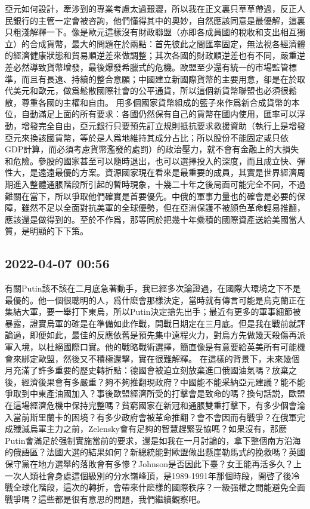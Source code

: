 \documentclass[twocolumn]{ctexart}
\begin{document}
亞元如何設計，牽涉到的專業考慮太過艱澀，所以我在正文裏只草草帶過，反正人民銀行的主管一定會被咨詢，他們懂得其中的奧妙，自然應該同意是最優解，這裏只粗淺解釋一下。像是歐元這樣沒有財政聯盟（亦即各成員國的稅收和支出相互獨立）的合成貨幣，最大的問題在於兩點：首先彼此之間匯率固定，無法視各經濟體的經濟健康狀態和貿易順逆差來做調整；其次各國的財政順逆差也有不同，嚴重逆差必然導致貨幣增發，最後爆發希臘式的危機。歐盟至少還有統一的市場監管標準，而且有長遠、持續的整合意願；中國建立新國際貨幣的主要用意，卻是在於取代美元和歐元，做爲鬆散國際社會的公平通貨，所以這個新貨幣聯盟也必須很鬆散，尊重各國的主權和自由。
用多個國家貨幣組成的籃子來作爲新合成貨幣的本位，自動滿足上面的所有要求：各國仍然保有自己的貨幣在國内使用，匯率可以浮動，增發完全自由，亞元銀行只要預先訂立規則抵抗要求救援資助（執行上是增發亞元來換該國貨幣，等於是人爲地維持其成分占比；所以股份不能固定或只依GDP計算，而必須考慮貨幣濫發的處罰）的政治壓力，就不會有金融上的大損失和危險。參股的國家甚至可以隨時退出，也可以選擇投入的深度，而且成立快、彈性大，是遠遠最優的方案。資源國家現在看來是最重要的成員，其實是世界經濟周期進入整體通脹階段所引起的暫時現象，十幾二十年之後局面可能完全不同，不過難關在當下，所以爭取他們確實是首要優先。中俄的軍事力量也的確會是必要的保障，雖然不足以全面對抗美軍的全球優勢，但在亞洲保護不被顔色革命輕易推翻，應該還是做得到的。至於不作爲，那等同於把幾十年纍積的國際資產送給美國當人質，是明顯的下下策。
\subsection*{2022-04-07 00:56}

有關Putin該不該在二月底急著動手，我已經多次論證過，在國際大環境之下不是最優的。他一個很聰明的人，爲什麽會那樣決定，當時就有傳言可能是烏克蘭正在集結大軍，要一舉打下東烏，所以Putin決定搶先出手；最近有更多的軍事細節被暴露，證實烏軍的確是在準備如此作戰，開戰日期定在三月底。但是我在戰前就評論過，即便如此，最佳的反應依舊是預先集中遠程火力，對烏方先做幾天殺傷再派軍入境，以杜絕國際口實。他的戰略戰術選擇，簡直像是有意要給英美所有可能機會來綁定歐盟，然後又不積極還擊，實在很難解釋。
在這樣的背景下，未來幾個月充滿了許多重要的歷史轉折點：德國會被迫立刻放棄進口俄國油氣嗎？放棄之後，經濟後果會有多嚴重？夠不夠推翻現政府？中國能不能采納亞元建議？能不能爭取到中東產油國加入？事後歐盟經濟所受的打擊會是致命的嗎？換句話説，歐盟在這場經濟危機中保持完整嗎？貧窮國家在新冠和通脹雙重打擊下，有多少個會淪入當前斯里蘭卡的困境？有多少政府會被革命推翻？會不會因而有戰爭？在俄軍完成殲滅烏軍主力之前，Zelensky會有足夠的智慧趕緊妥協嗎？如果沒有，那麽Putin會滿足於强制實施當前的要求，還是如我在一月討論的，拿下整個南方沿海的俄語區？法國大選的結果如何？新總統能對歐盟做出懸崖勒馬式的挽救嗎？英國保守黨在地方選舉的落敗會有多慘？Johnson是否因此下臺？女王能再活多久？上一次人類社會身處這個級別的分水嶺峰頂，是1989-1991年那個時段，開啓了後冷戰全球化階段，這次的轉折，會帶來什麽樣的國際秩序？一級强權之間能避免全面戰爭嗎？這些都是很有意思的問題，我們繼續觀察吧。
\end{document}
